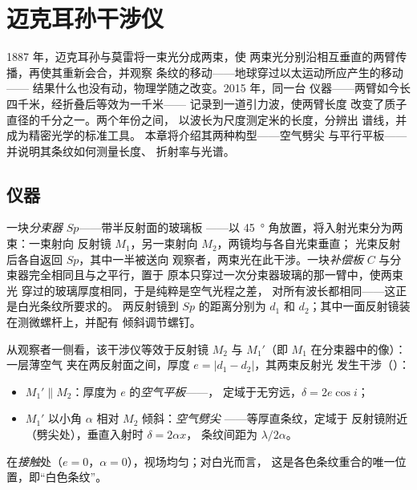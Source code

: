 \chapter{迈克耳孙干涉仪}\label{ch:b2:michelson}

1887 年，迈克耳孙与莫雷将一束光分成两束，使
两束光分别沿相互垂直的两臂传播，再使其重新会合，并观察
条纹的移动——地球穿过以太运动所应产生的移动——
结果什么也没有动，物理学随之改变。2015 年，同一台
仪器——两臂如今长四千米，经折叠后等效为一千米——
记录到一道引力波，使两臂长度
改变了质子直径的千分之一。两个年份之间，
以波长为尺度测定米的长度，分辨出
谱线，并成为精密光学的标准工具。
本章将介绍其两种构型——空气劈尖
与平行平板——并说明其条纹如何测量长度、
折射率与光谱。

\section{仪器}

\begin{definition}[迈克耳孙干涉仪]\label{def:b2:michelson:instrument}
一块\emph{分束器} $Sp$——带半反射面的玻璃板
——以 \qty{45}{\degree} 角放置，将入射光束分为两束：一束射向
反射镜 $M_1$，另一束射向 $M_2$，两镜均与各自光束垂直；
光束反射后各自返回 $Sp$，其中一半被送向
观察者，两束光在此干涉。一块\emph{补偿板}
$C$ 与分束器完全相同且与之平行，置于
原本只穿过一次分束器玻璃的那一臂中，使两束光
穿过的玻璃厚度相同，于是纯粹是空气光程之差，
对所有波长都相同——这正是白光条纹所要求的。
两反射镜到 $Sp$ 的距离分别为 $d_1$
和 $d_2$；其中一面反射镜装在测微螺杆上，并配有
倾斜调节螺钉。
\end{definition}

\begin{proposition}[等效装置]\label{prop:b2:michelson:equivalent}
从观察者一侧看，该干涉仪等效于反射镜
$M_2$ 与 $M_1'$（即 $M_1$ 在分束器中的像）：一层薄空气
夹在两反射面之间，厚度 $e = |d_1 - d_2|$，其两束反射光
发生干涉（）：
\begin{itemize}
  \item $M_1' \parallel M_2$：厚度为 $e$ 的\emph{空气平板}——，
        定域于无穷远，$\delta = 2e\cos i$；
  \item $M_1'$ 以小角 $\alpha$ 相对 $M_2$ 倾斜：\emph{空气劈尖}
——等厚直条纹，定域于
        反射镜附近（劈尖处），垂直入射时 $\delta = 2\alpha x$，
        条纹间距为 $\lambda/2\alpha$。
\end{itemize}
在\emph{接触}处（$e = 0$，$\alpha = 0$），视场均匀；对白光而言，
这是各色条纹重合的唯一位置，即“白色条纹”。
\end{proposition}

